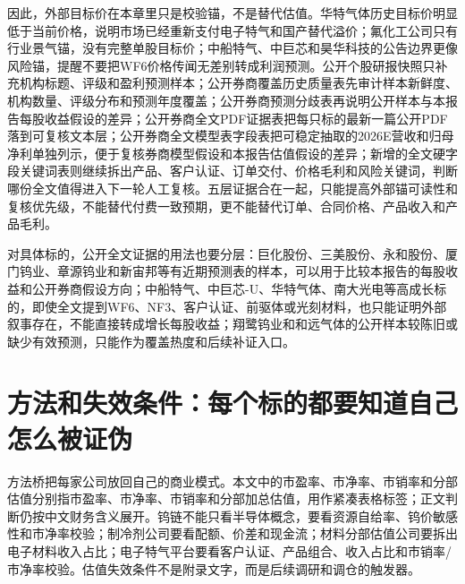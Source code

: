 因此，外部目标价在本章里只是校验锚，不是替代估值。华特气体历史目标价明显低于当前价格，说明市场已经重新支付电子特气和国产替代溢价；氟化工公司只有行业景气锚，没有完整单股目标价；中船特气、中巨芯和昊华科技的公告边界更像风险锚，提醒不要把WF6价格传闻无差别转成利润预测。公开个股研报快照只补充机构标题、评级和盈利预测样本；公开券商覆盖历史质量表先审计样本新鲜度、机构数量、评级分布和预测年度覆盖；公开券商预测分歧表再说明公开样本与本报告每股收益假设的差异；公开券商全文PDF证据表把每只标的最新一篇公开PDF落到可复核文本层；公开券商全文模型表字段表把可稳定抽取的2026E营收和归母净利单独列示，便于复核券商模型假设和本报告估值假设的差异；新增的全文硬字段关键词表则继续拆出产品、客户认证、订单交付、价格毛利和风险关键词，判断哪份全文值得进入下一轮人工复核。五层证据合在一起，只能提高外部锚可读性和复核优先级，不能替代付费一致预期，更不能替代订单、合同价格、产品收入和产品毛利。

对具体标的，公开全文证据的用法也要分层：巨化股份、三美股份、永和股份、厦门钨业、章源钨业和新宙邦等有近期预测表的样本，可以用于比较本报告的每股收益和公开券商假设方向；中船特气、中巨芯-U、华特气体、南大光电等高成长标的，即使全文提到WF6、NF3、客户认证、前驱体或光刻材料，也只能证明外部叙事存在，不能直接转成增长每股收益；翔鹭钨业和和远气体的公开样本较陈旧或缺少有效预测，只能作为覆盖热度和后续补证入口。

\section{方法和失效条件：每个标的都要知道自己怎么被证伪}
方法桥把每家公司放回自己的商业模式。本文中的市盈率、市净率、市销率和分部估值分别指市盈率、市净率、市销率和分部加总估值，用作紧凑表格标签；正文判断仍按中文财务含义展开。钨链不能只看半导体概念，要看资源自给率、钨价敏感性和市净率校验；制冷剂公司要看配额、价差和现金流；材料分部估值公司要拆出电子材料收入占比；电子特气平台要看客户认证、产品组合、收入占比和市销率/市净率校验。估值失效条件不是附录文字，而是后续调研和调仓的触发器。

